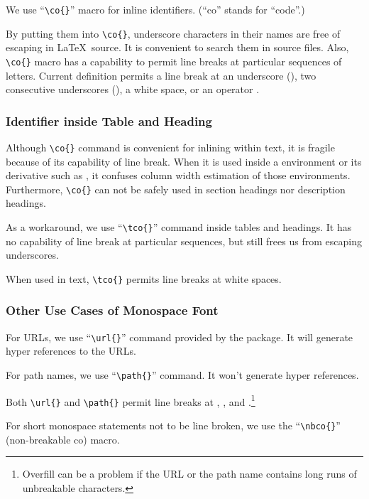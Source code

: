 We use ``\verb|\co{}|'' macro for inline identifiers.
(``co'' stands for ``code''.)

By putting them into \verb|\co{}|, underscore characters in
their names are free of escaping in \LaTeX\ source. It is convenient
to search them in source files. Also, \verb|\co{}|
macro has a capability to permit line breaks at particular
sequences of letters. Current definition permits a line break at
an underscore (\tco{_}), two consecutive underscores (\tco{__}),
a white space, or an operator \tco{->}.

\subsubsection{Identifier inside Table and Heading}
\label{sec:app:styleguide:Identifier inside Table and Heading}

Although \verb|\co{}| command is convenient for inlining within text,
it is fragile because of its capability of line break.
When it is used inside a  environment or its derivative
such as , it confuses column width
estimation of those environments.
Furthermore, \verb|\co{}| can not be safely used in section headings nor
description headings.

As a workaround, we use ``\verb|\tco{}|'' command
inside tables and headings. It has no capability of line break
at particular sequences, but still frees us from escaping
underscores.

When used in text, \verb|\tco{}| permits line breaks at
white spaces.

\subsubsection{Other Use Cases of Monospace Font}
\label{sec:app:styleguide:Other Use Cases of Monospace Font}

For URLs, we use ``\verb|\url{}|'' command provided by the
 package. It will generate hyper references to the
URLs.

For path names, we use ``\verb|\path{}|'' command. It won't
generate hyper references.

Both \verb|\url{}| and \verb|\path{}| permit line breaks
at \qco{/}, \qco{-}, and .\footnote{
  Overfill can be a problem if the URL or the path name contains
  long runs of unbreakable characters.
}

For short monospace statements not to be line broken, we use
the ``\verb|\nbco{}|'' (non-breakable co) macro.

